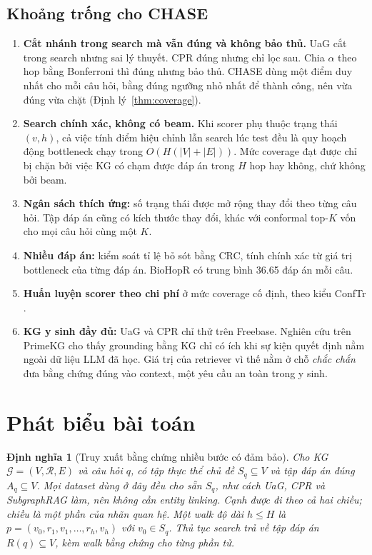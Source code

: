 \documentclass[11pt,a4paper]{article}
\newtheorem{definition}{Định nghĩa}
\theoremstyle{remark}
\newcommand{\G}{\mathcal{G}}
\newcommand{\Aq}{A_q}
\newcommand{\Sq}{S_q}
\newcommand{\method}{\textsc{CHASE}}
\begin{document}
\subsection{Khoảng trống cho \method}
\begin{enumerate}[nosep]
  \item \textbf{Cắt nhánh trong search mà vẫn đúng và không bảo thủ.} UaG cắt trong search nhưng sai lý thuyết. CPR đúng nhưng chỉ lọc sau. Chia $\alpha$ theo hop bằng Bonferroni thì đúng nhưng bảo thủ. \method{} dùng một điểm duy nhất cho mỗi câu hỏi, bằng đúng ngưỡng nhỏ nhất để thành công, nên vừa đúng vừa chặt (Định lý~\ref{thm:coverage}).
  \item \textbf{Search chính xác, không có beam.} Khi scorer phụ thuộc trạng thái $(v,h)$, cả việc tính điểm hiệu chỉnh lẫn search lúc test đều là quy hoạch động bottleneck chạy trong $O(H(|V|+|E|))$. Mức coverage đạt được chỉ bị chặn bởi việc KG có chạm được đáp án trong $H$ hop hay không, chứ không bởi beam.
  \item \textbf{Ngân sách thích ứng:} số trạng thái được mở rộng thay đổi theo từng câu hỏi. Tập đáp án cũng có kích thước thay đổi, khác với conformal top-$K$ vốn cho mọi câu hỏi cùng một $K$.
  \item \textbf{Nhiều đáp án:} kiểm soát tỉ lệ bỏ sót bằng CRC, tính chính xác từ giá trị bottleneck của từng đáp án. BioHopR có trung bình 36.65 đáp án mỗi câu.
  \item \textbf{Huấn luyện scorer theo chi phí} ở mức coverage cố định, theo kiểu ConfTr \cite{conftr}.
  \item \textbf{KG y sinh đầy đủ:} UaG và CPR chỉ thử trên Freebase. Nghiên cứu \cite{kgonlyhelps} trên PrimeKG cho thấy grounding bằng KG chỉ có ích khi sự kiện quyết định nằm ngoài dữ liệu LLM đã học. Giá trị của retriever vì thế nằm ở chỗ \emph{chắc chắn} đưa bằng chứng đúng vào context, một yêu cầu an toàn trong y sinh.
\end{enumerate}

\section{Phát biểu bài toán}

\begin{definition}[Truy xuất bằng chứng nhiều bước có đảm bảo]
Cho KG $\G=(V,\mathcal{R},E)$ và câu hỏi $q$, có tập thực thể chủ đề $\Sq\subseteq V$ và tập đáp án đúng $\Aq\subseteq V$. Mọi dataset dùng ở đây đều \emph{cho sẵn} $\Sq$, như cách UaG, CPR và SubgraphRAG làm, nên không cần entity linking. Cạnh được đi theo cả hai chiều; chiều là một phần của nhãn quan hệ. Một \emph{walk} độ dài $h\le H$ là $p=(v_0,r_1,v_1,\dots,r_h,v_h)$ với $v_0\in\Sq$. Thủ tục search trả về tập đáp án $R(q)\subseteq V$, kèm walk bằng chứng cho từng phần tử.
\end{definition}
\end{document}
